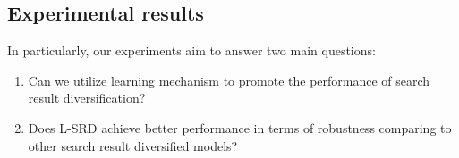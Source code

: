 \documentclass[review]{elsarticle}
\begin{document}
\subsection{Experimental results}\label{sec_expres}
In particularly, our experiments aim to answer two main questions:

\begin{enumerate}
\item Can we utilize learning mechanism to promote the performance of search result diversification?
\item Does L-SRD achieve better performance in terms of robustness comparing to other search result diversified models?
\end{enumerate}

\end{document}
